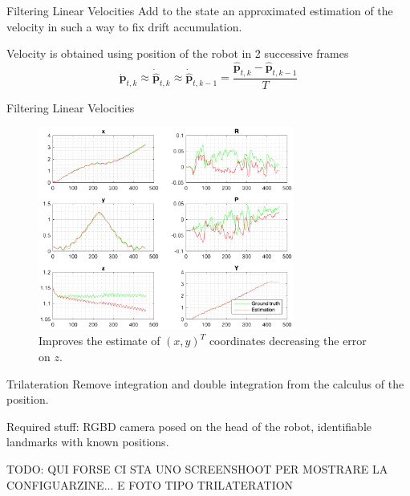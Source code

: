 \documentclass[10pt]{beamer}
\begin{document}
    \begin{frame}[fragile]{Filtering Linear Velocities}
        Add to the state an approximated estimation of the velocity in such a way to fix drift accumulation.

        Velocity is obtained using position of the robot in 2 successive frames
        \begin{equation*}
            \bm{\dot{p}}_{t,k} \approx \bm{\dot{\hat{p}}}_{t,k} \approx \bm{\dot{\hat{p}}}_{t,k-1}
            = \frac{\bm{\hat{p}}_{t,k} - \bm{\hat{p}}_{t,k-1}}{T}
        \end{equation*}
    \end{frame}

    \begin{frame}[fragile]{Filtering Linear Velocities}
        \begin{figure}
        \caption{Improves the estimate of $(x, y)^{T}$ coordinates decreasing the error on $z$.}
        \centering
        \includegraphics[width=0.75\textwidth]{images/accelerometer_prev_linearvelocity.png}
    \end{figure}

    \end{frame}

    \begin{frame}[fragile]{Trilateration}
        Remove integration and double integration from the calculus of the position.

        Required stuff: RGBD camera posed on the head of the robot, identifiable landmarks with known positions.

        TODO: QUI FORSE CI STA UNO SCREENSHOOT PER MOSTRARE LA CONFIGUARZINE... E FOTO TIPO TRILATERATION
    \end{frame}
\end{document}
